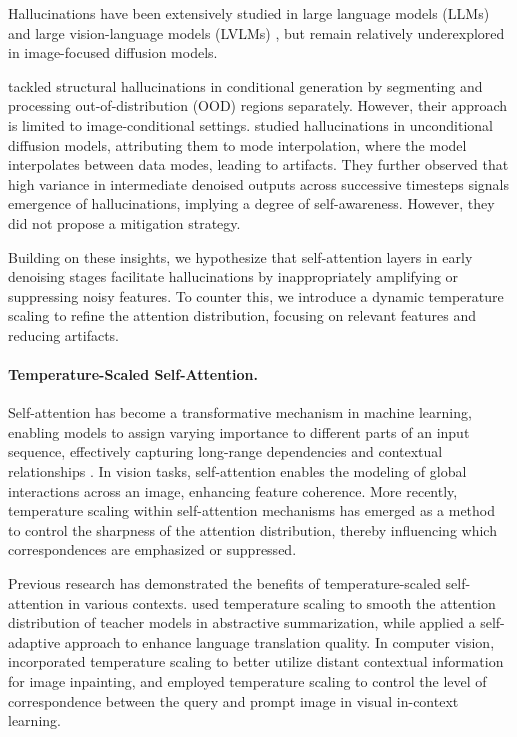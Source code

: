 Hallucinations have been extensively studied in large language models (LLMs) \citep{huang2023survey, tonmoy2024comprehensive, zhang2023siren} and large vision-language models (LVLMs) \citep{liu2024survey, guan2023hallusionbench, bai2024hallucination}, but remain relatively underexplored in image-focused diffusion models. 

\citet{kim2024tackling} tackled structural hallucinations in conditional generation by segmenting and processing out-of-distribution (OOD) regions separately. However, their approach is limited to image-conditional settings.
\citet{aithal2024understanding} studied hallucinations in unconditional diffusion models, attributing them to mode interpolation, where the model interpolates between data modes, leading to artifacts. 
They further observed that high variance in intermediate denoised outputs across successive timesteps signals emergence of hallucinations, implying a degree of self-awareness.
However, they did not propose a mitigation strategy.

Building on these insights, we hypothesize that self-attention layers in early denoising stages facilitate hallucinations by inappropriately amplifying or suppressing noisy features. 
To counter this, we introduce a dynamic temperature scaling to refine the attention distribution, focusing on relevant features and reducing artifacts.

\vspace{-10pt}
\paragraph{Temperature-Scaled Self-Attention.} Self-attention has become a transformative mechanism in machine learning, enabling models to assign varying importance to different parts of an input sequence, effectively capturing long-range dependencies and contextual relationships \citep{vaswani2017attention}.  
In vision tasks, self-attention enables the modeling of global interactions across an image, enhancing feature coherence. 
More recently, temperature scaling within self-attention mechanisms has emerged as a method to control the sharpness of the attention distribution, thereby influencing which correspondences are emphasized or suppressed.

Previous research has demonstrated the benefits of temperature-scaled self-attention in various contexts. 
\citet{zhang2021attention} used temperature scaling to smooth the attention distribution of teacher models in abstractive summarization, while \citet{lin2018learning} applied a self-adaptive approach to enhance language translation quality. 
In computer vision, \citet{zhou2023learning} incorporated temperature scaling to better utilize distant contextual information for image inpainting, and \citep{anonymous2025} employed temperature scaling to control the level of correspondence between the query and prompt image in visual in-context learning. 

